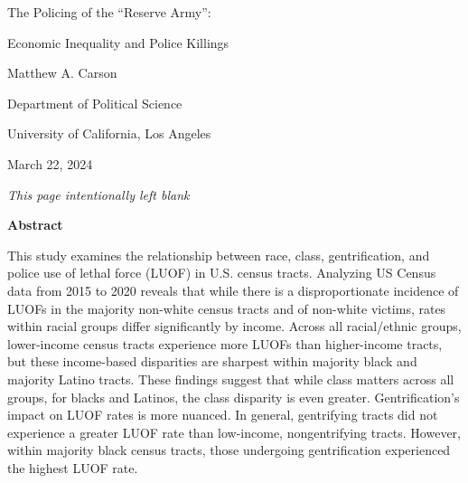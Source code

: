 \documentclass[12pt]{article}
\renewcommand{\headrulewidth}{1pt} %
\renewenvironment{abstract}
  {\par\noindent\centering\textbf{Abstract}\par}
  {\noindent\raggedright}
\begin{document}
\begin{titlepage}
  \thispagestyle{fancy}
  \renewcommand{\headrulewidth}{0pt} %
  \centering
  \vspace*{2in}
  The Policing of the ``Reserve Army'':\par
  Economic Inequality and Police Killings\par
  \vspace{1.2in}
  {Matthew A. Carson\par}
  \vspace{12pt}
  Department of Political Science\par
  University of California, Los Angeles\par
  \vspace{0.5in}
  {March 22, 2024\par}
\end{titlepage}

\thispagestyle{empty} %

\vspace*{\fill}
\hspace*{\fill}
\begin{center}
    \noindent{}\textit{This page intentionally left blank}
\end{center}
\hspace*{\fill}
\vspace*{\fill}

\clearpage

\begin{abstract}
This study examines the relationship between race, class, gentrification, and police use of lethal force (LUOF) in U.S. census tracts. Analyzing US Census data from 2015 to 2020 reveals that while there is a disproportionate incidence of LUOFs in the majority non-white census tracts and of non-white victims, rates within racial groups differ significantly by income. Across all racial/ethnic groups, lower-income census tracts experience more LUOFs than higher-income tracts, but these income-based disparities are sharpest within majority black and majority Latino tracts. These findings suggest that while class matters across all groups, for blacks and Latinos, the class disparity is even greater. Gentrification’s impact on LUOF rates is more nuanced. In general, gentrifying tracts did not experience a greater LUOF rate than low-income, nongentrifying tracts. However, within majority black census tracts, those undergoing gentrification experienced the highest LUOF rate.
\end{abstract}
\end{document}
